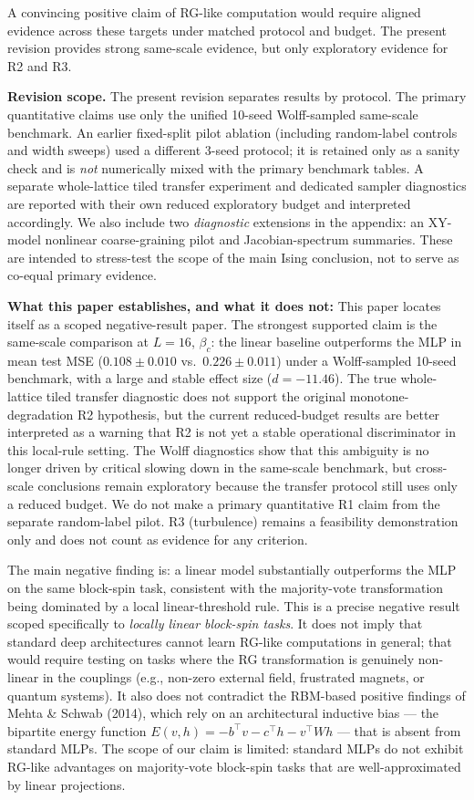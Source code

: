 \documentclass[12pt,a4paper]{memoir}
\begin{document}
A convincing positive claim of RG-like computation would require aligned
evidence across these targets under matched protocol and budget.  The present
revision provides strong same-scale evidence, but only exploratory evidence for
R2 and R3.

\textbf{Revision scope.}  The present revision separates results by protocol.
The primary quantitative claims use only the unified 10-seed Wolff-sampled
same-scale benchmark.  An earlier fixed-split pilot
ablation (including random-label controls and width sweeps) used a different
3-seed protocol; it is retained only as a sanity check and is \emph{not}
numerically mixed with the primary benchmark tables.  A separate
whole-lattice tiled transfer experiment and dedicated sampler diagnostics are
reported with their own reduced exploratory budget and interpreted
accordingly.  We also include two \emph{diagnostic} extensions in the appendix:
an XY-model nonlinear coarse-graining pilot and Jacobian-spectrum summaries.
These are intended to stress-test the scope of the main Ising conclusion, not
to serve as co-equal primary evidence.

\textbf{What this paper establishes, and what it does not:}
This paper locates itself as a scoped negative-result paper.
The strongest supported claim is the same-scale comparison at
$L=16$, $\beta_c$: the linear baseline outperforms the MLP
in mean test MSE ($0.108 \pm 0.010$ vs.\ $0.226 \pm 0.011$) under a
Wolff-sampled 10-seed benchmark, with a large and stable effect size
($d=-11.46$).  The true whole-lattice tiled
transfer diagnostic does not support the original monotone-degradation R2
hypothesis, but the current reduced-budget results are better interpreted as a
warning that R2 is not yet a stable operational discriminator in this local-rule
setting.  The Wolff diagnostics show that this ambiguity is no longer driven by
critical slowing down in the same-scale benchmark, but cross-scale conclusions
remain exploratory because the transfer protocol still uses only a reduced
budget.  We do not make a primary quantitative R1 claim from the separate
random-label pilot.  R3
(turbulence) remains a feasibility demonstration only and does not count as
evidence for any criterion.

The main negative finding is: a linear model substantially outperforms
the MLP on the same block-spin task, consistent with the majority-vote
transformation being dominated by a local linear-threshold rule.  This is a precise
negative result scoped specifically to \emph{locally linear block-spin
tasks}.  It does not imply that standard deep architectures cannot
learn RG-like computations in general; that would require testing on
tasks where the RG transformation is genuinely non-linear in the
couplings (e.g., non-zero external field, frustrated magnets, or quantum
systems).  It also does not contradict the RBM-based positive findings
of Mehta \& Schwab (2014), which rely on an architectural inductive bias
--- the bipartite energy function $E(v,h) = -b^\top v - c^\top h - v^\top W h$ ---
that is absent from standard MLPs.  The scope of our claim is limited:
standard MLPs do not exhibit RG-like advantages on majority-vote block-spin
tasks that are well-approximated by linear projections.
\end{document}

